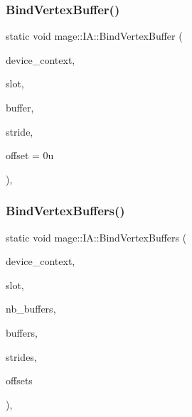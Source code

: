 \subsubsection{\texorpdfstring{Bind\+Vertex\+Buffer()}{BindVertexBuffer()}}
{\footnotesize\ttfamily static void mage\+::\+I\+A\+::\+Bind\+Vertex\+Buffer (\begin{DoxyParamCaption}\item[{I\+D3\+D11\+Device\+Context2 $\ast$}]{device\+\_\+context,  }\item[{U\+I\+NT}]{slot,  }\item[{I\+D3\+D11\+Buffer $\ast$}]{buffer,  }\item[{U\+I\+NT}]{stride,  }\item[{U\+I\+NT}]{offset = {\ttfamily 0u} }\end{DoxyParamCaption})\hspace{0.3cm}{\ttfamily [static]}, {\ttfamily [noexcept]}}

\hypertarget{structmage_1_1_i_a_a7a48695f4ac2a28dfe02477d4ebd8a02}{}\label{structmage_1_1_i_a_a7a48695f4ac2a28dfe02477d4ebd8a02} 
\subsubsection{\texorpdfstring{Bind\+Vertex\+Buffers()}{BindVertexBuffers()}}
{\footnotesize\ttfamily static void mage\+::\+I\+A\+::\+Bind\+Vertex\+Buffers (\begin{DoxyParamCaption}\item[{I\+D3\+D11\+Device\+Context2 $\ast$}]{device\+\_\+context,  }\item[{U\+I\+NT}]{slot,  }\item[{U\+I\+NT}]{nb\+\_\+buffers,  }\item[{I\+D3\+D11\+Buffer $\ast$const $\ast$}]{buffers,  }\item[{const U\+I\+NT $\ast$}]{strides,  }\item[{const U\+I\+NT $\ast$}]{offsets }\end{DoxyParamCaption})\hspace{0.3cm}{\ttfamily [static]}, {\ttfamily [noexcept]}}

\hypertarget{structmage_1_1_i_a_af1a0feb31c4fbd961812a4768dbfad31}{}\label{structmage_1_1_i_a_af1a0feb31c4fbd961812a4768dbfad31} 
